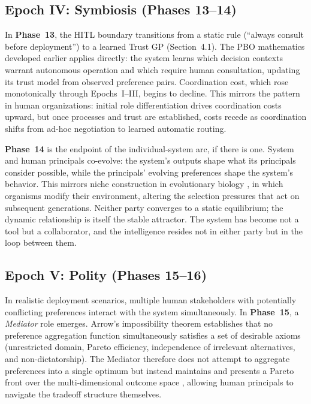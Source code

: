 \subsection{Epoch IV: Symbiosis (Phases 13--14)}

In \textbf{Phase~13}, the HITL boundary transitions from a static rule (``always consult before deployment'') to a learned Trust GP (Section~4.1). The PBO mathematics developed earlier applies directly: the system learns which decision contexts warrant autonomous operation and which require human consultation, updating its trust model from observed preference pairs. Coordination cost, which rose monotonically through Epochs~I--III, begins to decline. This mirrors the pattern in human organizations: initial role differentiation drives coordination costs upward, but once processes and trust are established, costs recede as coordination shifts from ad-hoc negotiation to learned automatic routing.

\textbf{Phase~14} is the endpoint of the individual-system arc, if there is one. System and human principals co-evolve: the system's outputs shape what its principals consider possible, while the principals' evolving preferences shape the system's behavior. This mirrors niche construction in evolutionary biology \cite{odling-smee2003}, in which organisms modify their environment, altering the selection pressures that act on subsequent generations. Neither party converges to a static equilibrium; the dynamic relationship is itself the stable attractor. The system has become not a tool but a collaborator, and the intelligence resides not in either party but in the loop between them.

\subsection{Epoch V: Polity (Phases 15--16)}

In realistic deployment scenarios, multiple human stakeholders with potentially conflicting preferences interact with the system simultaneously. In \textbf{Phase~15}, a \emph{Mediator} role emerges. Arrow's impossibility theorem \cite{arrow1951} establishes that no preference aggregation function simultaneously satisfies a set of desirable axioms (unrestricted domain, Pareto efficiency, independence of irrelevant alternatives, and non-dictatorship). The Mediator therefore does not attempt to aggregate preferences into a single optimum but instead maintains and presents a Pareto front over the multi-dimensional outcome space \cite{emmerich2006}, allowing human principals to navigate the tradeoff structure themselves.


